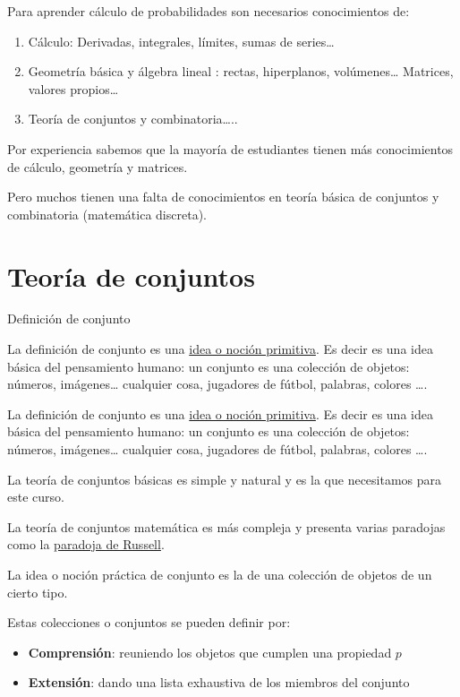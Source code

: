 \documentclass[
  letterpaper,
  DIV=11,
  numbers=noendperiod]{scrreprt}
\providecommand{\tightlist}{%
  \setlength{\itemsep}{0pt}\setlength{\parskip}{0pt}}\usepackage{longtable,booktabs,array}
\begin{document}
Para aprender cálculo de probabilidades son necesarios conocimientos de:

\begin{enumerate}
\def\labelenumi{\arabic{enumi}.}
\tightlist
\item
  Cálculo: Derivadas, integrales, límites, sumas de series\ldots{}
\item
  Geometría básica y álgebra lineal : rectas, hiperplanos,
  volúmenes\ldots{} Matrices, valores propios\ldots{}
\item
  Teoría de conjuntos y combinatoria\ldots..
\end{enumerate}

Por experiencia sabemos que la mayoría de estudiantes tienen más
conocimientos de cálculo, geometría y matrices.

Pero muchos tienen una falta de conocimientos en teoría básica de
conjuntos y combinatoria (matemática discreta).

\section{Teoría de conjuntos}\label{teoruxeda-de-conjuntos}

Definición de conjunto

La definición de conjunto es una
\href{https://es.wikipedia.org/wiki/Concepto_primitivo}{idea o noción
primitiva}. Es decir es una idea básica del pensamiento humano: un
conjunto es una colección de objetos: números, imágenes\ldots{}
cualquier cosa, jugadores de fútbol, palabras, colores \ldots.

La definición de conjunto es una
\href{https://es.wikipedia.org/wiki/Concepto_primitivo}{idea o noción
primitiva}. Es decir es una idea básica del pensamiento humano: un
conjunto es una colección de objetos: números, imágenes\ldots{}
cualquier cosa, jugadores de fútbol, palabras, colores \ldots.

La teoría de conjuntos básicas es simple y natural y es la que
necesitamos para este curso.

La teoría de conjuntos matemática es más compleja y presenta varias
paradojas como la
\href{https://es.wikipedia.org/wiki/Paradoja_de_Russell}{paradoja de
Russell}.

La idea o noción práctica de conjunto es la de una colección de objetos
de un cierto tipo.

Estas colecciones o conjuntos se pueden definir por:

\begin{itemize}
\tightlist
\item
  \textbf{Comprensión}: reuniendo los objetos que cumplen una propiedad
  \(p\)
\item
  \textbf{Extensión}: dando una lista exhaustiva de los miembros del
  conjunto
\end{itemize}
\end{document}
